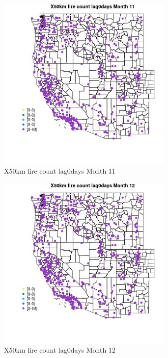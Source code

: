 \begin{figure} 
\centering  
\includegraphics[width=0.77\textwidth]{Code_Outputs/Report_ML_input_PM25_Step4_part_e_de_duplicated_aves_compiled_2019-05-14wNAs_MapObsMo11X50km_fire_count_lag0days.jpg} 
\caption{\label{fig:Report_ML_input_PM25_Step4_part_e_de_duplicated_aves_compiled_2019-05-14wNAsMapObsMo11X50km_fire_count_lag0days}X50km fire count lag0days Month 11} 
\end{figure} 
 

\begin{figure} 
\centering  
\includegraphics[width=0.77\textwidth]{Code_Outputs/Report_ML_input_PM25_Step4_part_e_de_duplicated_aves_compiled_2019-05-14wNAs_MapObsMo12X50km_fire_count_lag0days.jpg} 
\caption{\label{fig:Report_ML_input_PM25_Step4_part_e_de_duplicated_aves_compiled_2019-05-14wNAsMapObsMo12X50km_fire_count_lag0days}X50km fire count lag0days Month 12} 
\end{figure} 
 

